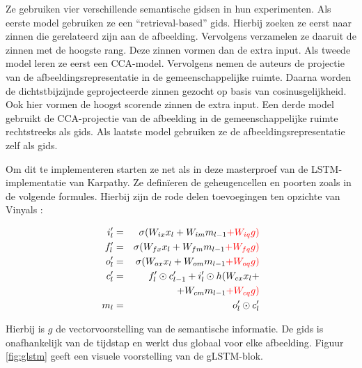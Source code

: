 Ze gebruiken vier verschillende semantische gidsen in hun experimenten. Als eerste model gebruiken ze een ``retrieval-based'' gids. Hierbij zoeken ze eerst naar zinnen die gerelateerd zijn aan de afbeelding. Vervolgens verzamelen ze daaruit de zinnen met de hoogste rang. Deze zinnen vormen dan de extra input.
Als tweede model leren ze eerst een CCA-model. Vervolgens nemen de auteurs de projectie van de afbeeldingsrepresentatie in de gemeenschappelijke ruimte. Daarna worden de dichtstbijzijnde geprojecteerde zinnen gezocht op basis van cosinusgelijkheid. Ook hier vormen de hoogst scorende zinnen de extra input.
Een derde model gebruikt de CCA-projectie van de afbeelding in de gemeenschappelijke ruimte rechtstreeks als gids.
Als laatste model gebruiken ze de afbeeldingsrepresentatie zelf als gids.

Om dit te implementeren starten ze net als in deze masterproef van de LSTM-implementatie van Karpathy. Ze defin\"ieren de geheugencellen en poorten zoals in de volgende formules. Hierbij zijn de rode delen toevoegingen ten opzichte van Vinyals :

%
\begin{eqnarray}
\vspace{-3mm}
\label{glstm-memory-start}
i_l' & = & \sigma (W_{ix} x_l + W_{im} m_{l-1} \color{red}{+ W_{iq} g}) \label{glstm-input} \\
f_l' & = & \sigma (W_{fx} x_l + W_{fm} m_{l-1} \color{red}{+ W_{fq} g}) \\
o_l' & = & \sigma (W_{ox} x_l + W_{om} m_{l-1} \color{red}{+ W_{oq} g}) \\
c_l' & = & f_l' \odot c_{l-1}' + i_l' \odot h(W_{cx} x_l + \nonumber \\
&   & + W_{cm} m_{l-1} \color{red}{+ W_{cq} g}) \\
m_l & = & o_l' \odot c_l'
\label{glstm-memory}
\vspace{-3mm}
\end{eqnarray}

Hierbij is $g$ de vectorvoorstelling van de semantische informatie. De gids is onafhankelijk van de tijdstap en werkt dus globaal voor elke afbeelding. Figuur \ref{fig:glstm} geeft een visuele voorstelling van de gLSTM-blok.

